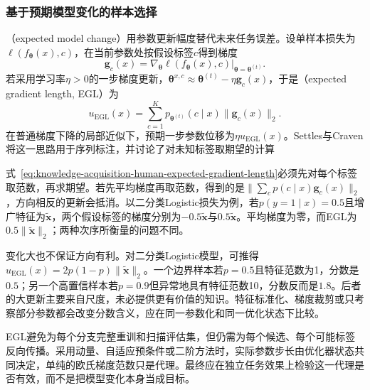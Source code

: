 \subsubsection{基于预期模型变化的样本选择}
\label{sec:knowledge-acquisition-human-expected-model-change}

（expected model change）用参数更新幅度替代未来任务误差。设单样本损失为$\ell(f_{\bm{\theta}}(x),c)$，在当前参数处按假设标签$c$得到梯度
\begin{equation}
  \bm{g}_c(x)
  =\left.
    \nabla_{\bm{\theta}}
    \ell(f_{\bm{\theta}}(x),c)
    \right|_{\bm{\theta}=\bm{\theta}^{(t)}}.
  \label{eq:knowledge-acquisition-human-hypothetical-gradient}
\end{equation}
若采用学习率$\eta>0$的一步梯度更新，$\bm{\theta}^{x,c}\approx\bm{\theta}^{(t)}-\eta\bm{g}_c(x)$，于是（expected gradient length, EGL）为
\begin{equation}
  u_{\mathrm{EGL}}(x)
  =\sum_{c=1}^{K}
    p_{\bm{\theta}^{(t)}}(c\mid x)
    \lVert\bm{g}_c(x)\rVert_2.
  \label{eq:knowledge-acquisition-human-expected-gradient-length}
\end{equation}
在普通梯度下降的局部近似下，预期一步参数位移为$\eta u_{\mathrm{EGL}}(x)$。Settles与Craven将这一思路用于序列标注，并讨论了对未知标签取期望的计算

式~\eqref{eq:knowledge-acquisition-human-expected-gradient-length}必须先对每个标签取范数，再求期望。若先平均梯度再取范数，得到的是$\lVert\sum_c p(c\mid x)\bm{g}_c(x)\rVert_2$，方向相反的更新会抵消。以二分类Logistic损失为例，若$p(y=1\mid x)=0.5$且增广特征为$\widetilde{\bm{x}}$，两个假设标签的梯度分别为$-0.5\widetilde{\bm{x}}$与$0.5\widetilde{\bm{x}}$。平均梯度为零，而EGL为$0.5\lVert\widetilde{\bm{x}}\rVert_2$；两种次序所衡量的问题不同。

变化大也不保证方向有利。对二分类Logistic模型，可推得$u_{\mathrm{EGL}}(x)=2p(1-p)\lVert\widetilde{\bm{x}}\rVert_2$。一个边界样本若$p=0.5$且特征范数为1，分数是$0.5$；另一个高置信样本若$p=0.9$但异常地具有特征范数10，分数反而是$1.8$。后者的大更新主要来自尺度，未必提供更有价值的知识。特征标准化、梯度裁剪或只考察部分参数都会改变分数含义，应在同一参数化和同一优化状态下比较。

EGL避免为每个分支完整重训和扫描评估集，但仍需为每个候选、每个可能标签反向传播。采用动量、自适应预条件或二阶方法时，实际参数步长由优化器状态共同决定，单纯的欧氏梯度范数只是代理。最终应在独立任务效果上检验这一代理是否有效，而不是把模型变化本身当成目标。

